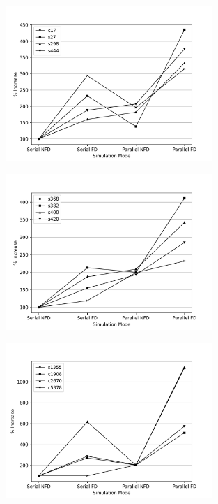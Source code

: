 \documentclass[a4paper,12pt]{article}
\begin{document}
\begin{figure}[h]  
  \centering
    \includegraphics[width=0.7\textwidth]{figure1.png}
\end{figure}


\begin{figure}[h]  
  \centering
    \includegraphics[width=0.7\textwidth]{figure2.png}
\end{figure}

\begin{figure}[h]  
  \centering
    \includegraphics[width=0.7\textwidth]{figure3.png}
\end{figure}
\end{document}
